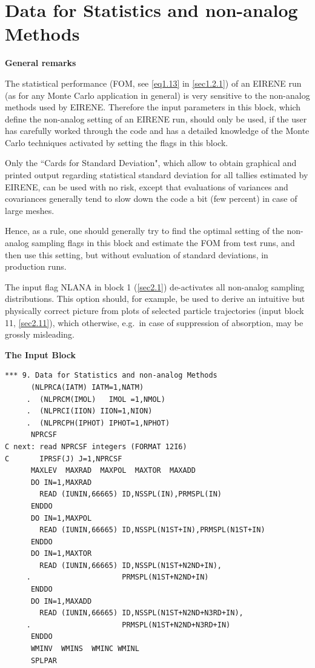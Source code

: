 \section{Data for Statistics and non-analog Methods} \label{sec2.9}

\textbf{General remarks} 

\medskip 

The statistical performance (\ac{FOM}, see \cref{eq1.13} in \cref{sec1.2.1}) of
an EIRENE run (as for any Monte Carlo application in general) is very sensitive
to the non-analog methods used by EIRENE.
Therefore the input parameters in this block, which define the non-analog
setting of an EIRENE run, should only be used, if the user has carefully worked
through the code and has a detailed knowledge of the Monte Carlo techniques
activated by setting the flags in this block.

Only the ``Cards for Standard Deviation", which allow to obtain graphical and
printed output regarding statistical standard deviation for all tallies
estimated by EIRENE, can be used with no risk, except that evaluations of
variances and covariances generally tend to slow down the code a bit (few
percent) in case of large meshes.

Hence, as a rule, one should generally try to find the optimal setting of the
non-analog sampling flags in this block and estimate the \ac{FOM} from test
runs, and then use this setting, but without evaluation of standard deviations,
in production runs.

The input flag NLANA in block 1 (\cref{sec2.1}) de-activates all non-analog
sampling distributions.
This option should, for example, be used to derive an intuitive but physically
correct picture from plots of selected particle trajectories (input block 11,
\cref{sec2.11}), which otherwise, e.g.\ in case of suppression of absorption,
may be grossly misleading.

\medskip

\textbf{The Input Block} 

\begin{lstlisting}
*** 9. Data for Statistics and non-analog Methods
      (NLPRCA(IATM) IATM=1,NATM) 
     .  (NLPRCM(IMOL)   IMOL =1,NMOL)
     .  (NLPRCI(IION) IION=1,NION) 
     .  (NLPRCPH(IPHOT) IPHOT=1,NPHOT)
      NPRCSF
C next: read NPRCSF integers (FORMAT 12I6) 
C       IPRSF(J) J=1,NPRCSF
      MAXLEV  MAXRAD  MAXPOL  MAXTOR  MAXADD
      DO IN=1,MAXRAD
        READ (IUNIN,66665) ID,NSSPL(IN),PRMSPL(IN)
      ENDDO
      DO IN=1,MAXPOL
        READ (IUNIN,66665) ID,NSSPL(N1ST+IN),PRMSPL(N1ST+IN)
      ENDDO
      DO IN=1,MAXTOR
        READ (IUNIN,66665) ID,NSSPL(N1ST+N2ND+IN),
     .                     PRMSPL(N1ST+N2ND+IN)
      ENDDO
      DO IN=1,MAXADD
        READ (IUNIN,66665) ID,NSSPL(N1ST+N2ND+N3RD+IN),
     .                     PRMSPL(N1ST+N2ND+N3RD+IN)
      ENDDO
      WMINV  WMINS  WMINC WMINL
      SPLPAR
\end{lstlisting} 


